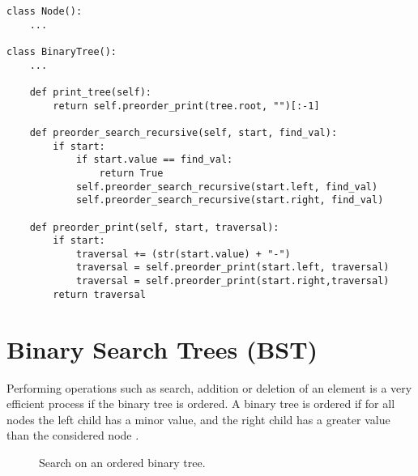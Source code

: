 \begin{lstlisting}[firstnumber=1, caption={Recursive pre-order traversal and search implementation.}]
class Node():
	...

class BinaryTree():
	...

	def print_tree(self):
		return self.preorder_print(tree.root, "")[:-1]

	def preorder_search_recursive(self, start, find_val):
		if start:
			if start.value == find_val:
				return True
			self.preorder_search_recursive(start.left, find_val)
			self.preorder_search_recursive(start.right, find_val)	
	
	def preorder_print(self, start, traversal):
		if start:
			traversal += (str(start.value) + "-")
			traversal = self.preorder_print(start.left, traversal)
			traversal = self.preorder_print(start.right,traversal)
		return traversal
\end{lstlisting}

\section{Binary Search Trees (BST)}
Performing operations such as search, addition or deletion of an element is a very efficient process if the binary tree is ordered. A binary tree is ordered if for all nodes the left child has a minor value, and the right child has a greater value than the considered node \cite{wikibinsearchtree}.

\begin{figure}[H]
\centering
{}
\caption[Search on an ordered binary tree.]{Search on an ordered binary tree.}
\label{trees_13}
\end{figure}

